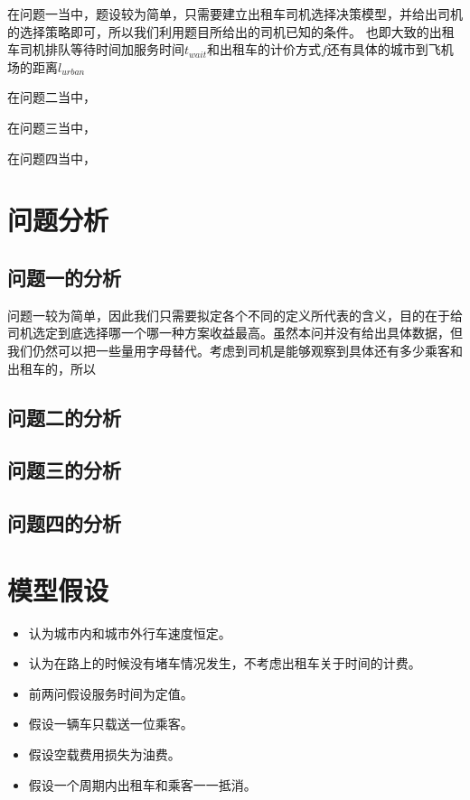 \documentclass{cumcmthesis}
\begin{document}
\par 
在问题一当中，题设较为简单，只需要建立出租车司机选择决策模型，并给出司机的选择策略即可，所以我们利用题目所给出的司机已知的条件。
也即大致的出租车司机排队等待时间加服务时间$t_{wait}$和出租车的计价方式$f$还有具体的城市到飞机场的距离$l_{urban}$

\par 
在问题二当中，

\par 
在问题三当中，

\par 
在问题四当中，

\newpage
\section{问题分析}
\subsection{问题一的分析}
问题一较为简单，因此我们只需要拟定各个不同的定义所代表的含义，目的在于给司机选定到底选择哪一个哪一种方案收益最高。虽然本问并没有给出具体数据，但我们仍然可以把一些量用字母替代。考虑到司机是能够观察到具体还有多少乘客和出租车的，所以
\subsection{问题二的分析}

\subsection{问题三的分析}

\subsection{问题四的分析}


\newpage
\section{模型假设}
\begin{itemize}
	\item 认为城市内和城市外行车速度恒定。
	\item 认为在路上的时候没有堵车情况发生，不考虑出租车关于时间的计费。
	\item 前两问假设服务时间为定值。
	\item 假设一辆车只载送一位乘客。
	\item 假设空载费用损失为油费。
	\item 假设一个周期内出租车和乘客一一抵消。
\end{itemize}
\end{document}

